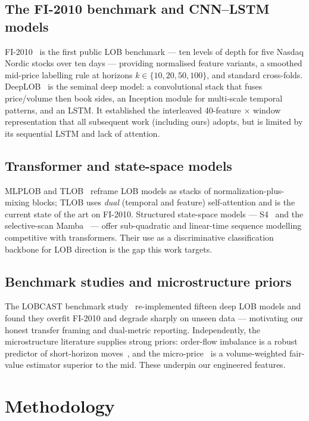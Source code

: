 \documentclass[10pt,twocolumn]{article}
\begin{document}
\subsection{The FI-2010 benchmark and CNN--LSTM models}
FI-2010~\cite{fi2010} is the first public LOB benchmark --- ten levels of depth for five Nasdaq Nordic stocks
over ten days --- providing normalised feature variants, a smoothed mid-price labelling rule at horizons
$k\in\{10,20,50,100\}$, and standard cross-folds. DeepLOB~\cite{deeplob} is the seminal deep model: a
convolutional stack that fuses price/volume then book sides, an Inception module for multi-scale temporal
patterns, and an LSTM. It established the interleaved 40-feature $\times$ window representation that all
subsequent work (including ours) adopts, but is limited by its sequential LSTM and lack of attention.

\subsection{Transformer and state-space models}
MLPLOB and TLOB~\cite{tlob} reframe LOB models as stacks of normalization-plus-mixing blocks; TLOB uses
\emph{dual} (temporal and feature) self-attention and is the current state of the art on FI-2010. Structured
state-space models --- S4~\cite{s4} and the selective-scan Mamba~\cite{mamba} --- offer sub-quadratic and
linear-time sequence modelling competitive with transformers. Their use as a discriminative classification
backbone for LOB direction is the gap this work targets.

\subsection{Benchmark studies and microstructure priors}
The LOBCAST benchmark study~\cite{lobcast} re-implemented fifteen deep LOB models and found they overfit
FI-2010 and degrade sharply on unseen data --- motivating our honest transfer framing and dual-metric
reporting. Independently, the microstructure literature supplies strong priors: order-flow imbalance is a
robust predictor of short-horizon moves~\cite{ofi}, and the micro-price~\cite{microprice} is a volume-weighted
fair-value estimator superior to the mid. These underpin our engineered features.

\section{Methodology}
\end{document}
